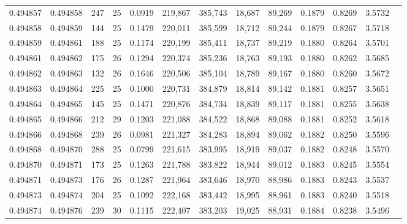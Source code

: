 \begin{tabular}{rrrrrrrrrrrrr}
0.494857 & 0.494858 & 247 &  25 &                                     0.0919 & 219,867 & 385,743 &  18,687 &  89,269 & 0.1879 & 0.8269 & 3.5732 \\
0.494858 & 0.494859 & 144 &  25 &                                     0.1479 & 220,011 & 385,599 &  18,712 &  89,244 & 0.1879 & 0.8267 & 3.5718 \\
0.494859 & 0.494861 & 188 &  25 &                                     0.1174 & 220,199 & 385,411 &  18,737 &  89,219 & 0.1880 & 0.8264 & 3.5701 \\
0.494861 & 0.494862 & 175 &  26 &                                     0.1294 & 220,374 & 385,236 &  18,763 &  89,193 & 0.1880 & 0.8262 & 3.5685 \\
0.494862 & 0.494863 & 132 &  26 &                                     0.1646 & 220,506 & 385,104 &  18,789 &  89,167 & 0.1880 & 0.8260 & 3.5672 \\
0.494863 & 0.494864 & 225 &  25 &                                     0.1000 & 220,731 & 384,879 &  18,814 &  89,142 & 0.1881 & 0.8257 & 3.5651 \\
0.494864 & 0.494865 & 145 &  25 &                                     0.1471 & 220,876 & 384,734 &  18,839 &  89,117 & 0.1881 & 0.8255 & 3.5638 \\
0.494865 & 0.494866 & 212 &  29 &                                     0.1203 & 221,088 & 384,522 &  18,868 &  89,088 & 0.1881 & 0.8252 & 3.5618 \\
0.494866 & 0.494868 & 239 &  26 &                                     0.0981 & 221,327 & 384,283 &  18,894 &  89,062 & 0.1882 & 0.8250 & 3.5596 \\
0.494868 & 0.494870 & 288 &  25 &                                     0.0799 & 221,615 & 383,995 &  18,919 &  89,037 & 0.1882 & 0.8248 & 3.5570 \\
0.494870 & 0.494871 & 173 &  25 &                                     0.1263 & 221,788 & 383,822 &  18,944 &  89,012 & 0.1883 & 0.8245 & 3.5554 \\
0.494871 & 0.494873 & 176 &  26 &                                     0.1287 & 221,964 & 383,646 &  18,970 &  88,986 & 0.1883 & 0.8243 & 3.5537 \\
0.494873 & 0.494874 & 204 &  25 &                                     0.1092 & 222,168 & 383,442 &  18,995 &  88,961 & 0.1883 & 0.8240 & 3.5518 \\
0.494874 & 0.494876 & 239 &  30 &                                     0.1115 & 222,407 & 383,203 &  19,025 &  88,931 & 0.1884 & 0.8238 & 3.5496 \\

\end{tabular}
